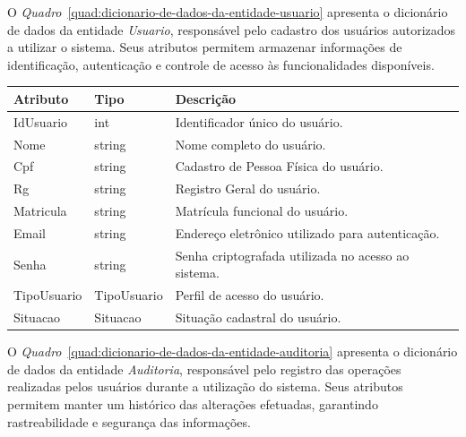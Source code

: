 O \textit{Quadro}~\ref{quad:dicionario-de-dados-da-entidade-usuario} apresenta o dicionário de dados da entidade \textit{Usuario}, responsável pelo cadastro dos usuários autorizados a utilizar o sistema. Seus atributos permitem armazenar informações de identificação, autenticação e controle de acesso às funcionalidades disponíveis.

\begin{quadro}[H]
\caption[Dicionário de dados da entidade Usuario]{Dicionário de dados da entidade Usuario}
\label{quad:dicionario-de-dados-da-entidade-usuario}

\begin{tabular}{|p{}|p{}|p{}|}
\hline
\textbf{Atributo} & \textbf{Tipo} & \textbf{Descrição} \\ 
\hline
IdUsuario & int & Identificador único do usuário. \\ 
\hline
Nome & string & Nome completo do usuário. \\ 
\hline
Cpf & string & Cadastro de Pessoa Física do usuário. \\ 
\hline
Rg & string & Registro Geral do usuário. \\ 
\hline
Matricula & string & Matrícula funcional do usuário. \\ 
\hline
Email & string & Endereço eletrônico utilizado para autenticação. \\ 
\hline
Senha & string & Senha criptografada utilizada no acesso ao sistema. \\ 
\hline
TipoUsuario & TipoUsuario & Perfil de acesso do usuário. \\ 
\hline
Situacao & Situacao & Situação cadastral do usuário. \\ 
\hline
\end{tabular}


\end{quadro}


O \textit{Quadro}~\ref{quad:dicionario-de-dados-da-entidade-auditoria} apresenta o dicionário de dados da entidade \textit{Auditoria}, responsável pelo registro das operações realizadas pelos usuários durante a utilização do sistema. Seus atributos permitem manter um histórico das alterações efetuadas, garantindo rastreabilidade e segurança das informações.

